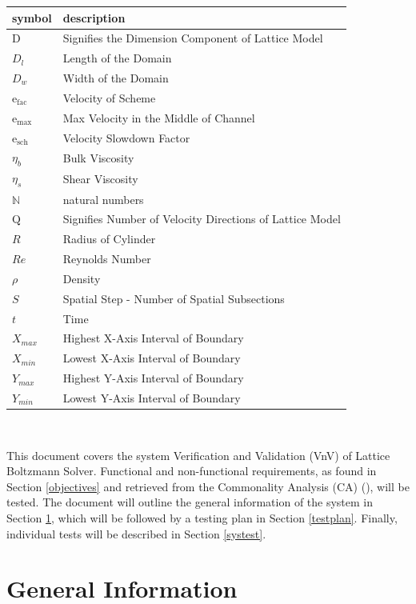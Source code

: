 \documentclass[12pt, titlepage]{article}
\newcommand{\famname}{Lattice Boltzmann Solver}
\begin{document}
\renewcommand{\arraystretch}{1.2}
\begin{tabular}{l l} 
  \toprule		
  \textbf{symbol} & \textbf{description}\\
  \midrule 
  $\mathrm{D}$ & Signifies the Dimension Component of Lattice Model\\
  $D_{l}$ & Length of the Domain\\
  $D_{w}$ & Width of the Domain\\
  $\mathrm{e_{fac}}$ & Velocity of Scheme\\
  $\mathrm{e_{max}}$ & Max Velocity in the Middle of Channel\\
  $\mathrm{e_{sch}}$ & Velocity Slowdown Factor\\
  $\eta_b$ & Bulk Viscosity \\
  $\eta_s$ & Shear Viscosity \\
  $\mathbb{N}$ & natural numbers\\
  $\mathrm{Q}$ & Signifies Number of Velocity Directions of Lattice Model\\
  $R$ & Radius of Cylinder\\
  $Re$ & Reynolds Number\\
  $\rho$ & Density \\
  $S$ & Spatial Step - Number of Spatial Subsections\\
  $t$ & Time \\
  $X_{max}$ & Highest X-Axis Interval of Boundary\\
  $X_{min}$ & Lowest X-Axis Interval of Boundary\\
  $Y_{max}$ & Highest Y-Axis Interval of Boundary\\
  $Y_{min}$ & Lowest Y-Axis Interval of Boundary\\
  \bottomrule
\end{tabular}\\

\newpage


\noindent This document covers the system Verification and Validation (VnV) of
\famname . Functional and non-functional requirements, as found in Section
\ref{objectives} and retrieved from the Commonality Analysis (CA)
(\citet{LBM_CA_PM}), will be tested. The document will outline the general
information of the system in Section \ref{generalinfo}, which will be followed
by a testing plan in Section \ref{testplan}. Finally, individual tests will be
described in Section \ref{systest}.

\section{General Information} \label{generalinfo}
\end{document}
